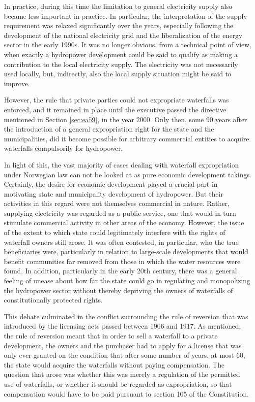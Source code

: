 In practice, during this time the limitation to general electricity supply also became less important in practice. In particular, the interpretation of the supply requirement was relaxed significantly over the years, especially following the development of the national electricity grid and the liberalization of the energy sector in the early 1990s. It was no longer obvious, from a technical point of view, when exactly a hydropower development could be said to qualify as making a contribution to the local electricity supply. The electricity was not necessarily used locally, but, indirectly, also the local supply situation might be said to improve.

However, the rule that private parties could not expropriate waterfalls was enforced, and it remained in place until the executive passed the directive mentioned in Section \ref{sec:ea59}, in the year 2000. Only then, some 90 years after the introduction of a general expropriation right for the state and the municipalities, did it become possible for arbitrary commercial entities to acquire waterfalls compulsorily for hydropower.

In light of this, the vast majority of cases dealing with waterfall expropriation under Norwegian law can not be looked at as pure economic development takings. Certainly, the desire for economic development played a crucial part in motivating state and municipality development of hydropower. But their activities in this regard were not themselves commercial in nature. Rather, supplying electricity was regarded as a public service, one that would in turn stimulate commercial activity in other areas of the economy. However, the issue of the extent to which state could legitimately interfere with the rights of waterfall owners still arose. It was often contested, in particular, who the true beneficiaries were, particularly in relation to large-scale developments that would benefit communities far removed from those in which the water resources were found. In addition, particularly in the early 20th century, there was a general feeling of unease about how far the state could go in regulating and monopolizing the hydropower sector without thereby depriving the owners of waterfalls of constitutionally protected rights.

This debate culminated in the conflict surrounding the rule of reversion that was introduced by the licensing acts passed between 1906 and 1917. As mentioned, the rule of reversion meant that in order to sell a waterfall to a private development, the owners and the purchaser had to apply for a license that was only ever granted on the condition that after some number of years, at most 60, the state would acquire the waterfalls without paying compensation. The question that arose was whether this was merely a regulation of the permitted use of waterfalls, or whether it should be regarded as expropriation, so that compensation would have to be paid pursuant to section 105 of the Constitution.

